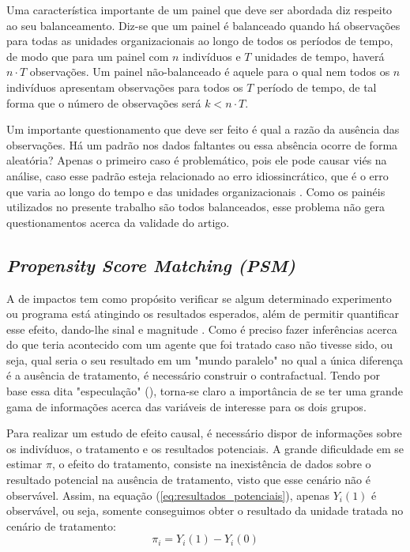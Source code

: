Uma característica importante de um painel que deve ser abordada diz respeito ao seu balanceamento. Diz-se que um painel é balanceado quando há observações para todas as unidades organizacionais ao longo de todos os períodos de tempo, de modo que para um painel com $n$ indivíduos e $T$ unidades de tempo, haverá $n \cdot T$ observações. Um painel não-balanceado é aquele para o qual nem todos os $n$ indivíduos apresentam observações para todos os $T$ período de tempo, de tal forma que o número de observações será $k < n \cdot T$.
    
Um importante questionamento que deve ser feito é qual a razão da ausência das observações. Há um padrão nos dados faltantes ou essa absência ocorre de forma aleatória? Apenas o primeiro caso é problemático, pois ele pode causar viés na análise, caso esse padrão esteja relacionado ao erro idiossincrático, que é o erro que varia ao longo do tempo e das unidades organizacionais \cite{Hsiao2014}. Como os painéis utilizados no presente trabalho são todos balanceados, esse problema não gera questionamentos acerca da validade do artigo.

\subsection{\textit{Propensity Score Matching (PSM)}}

A  de impactos tem como propósito verificar se algum determinado experimento ou programa está atingindo os resultados esperados, além de permitir quantificar esse efeito, dando-lhe sinal e magnitude \cite{CameronTrivedi2005}. Como é preciso fazer inferências acerca do que teria acontecido com um agente que foi tratado caso não tivesse sido, ou seja, qual seria o seu resultado em um "mundo paralelo" no qual a única diferença é a ausência de tratamento, é necessário construir o contrafactual. Tendo por base essa dita "especulação" (), torna-se claro a importância de se ter uma grande gama de informações acerca das variáveis de interesse para os dois grupos.

Para realizar um estudo de efeito causal, é necessário dispor de informações sobre os indivíduos, o tratamento e os resultados potenciais. A grande dificuldade em se estimar $\pi$, o efeito do tratamento, consiste na inexistência de dados sobre o resultado potencial na ausência de tratamento, visto que esse cenário não é observável. Assim, na equação (\ref{eq:resultados_potenciais}), apenas $Y_i(1)$ é observável, ou seja, somente conseguimos obter o resultado da unidade tratada no cenário de tratamento:
\begin{equation} \label{eq:resultados_potenciais} \tag{3.1.2}
\pi_i = Y_i(1) - Y_i(0)
\end{equation}


